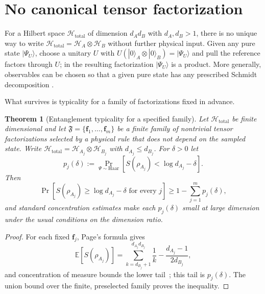 \documentclass[12pt,a4paper]{article}
\newtheorem{theorem}{Theorem}[section]
\begin{document}
\appendix

\section{No canonical tensor factorization}
\label{sec:nopref}

For a Hilbert space $\mathcal H_{\mathrm{total}}$ of dimension $d_Ad_B$ with $d_A,d_B>1$, there is no unique way to write $\mathcal H_{\mathrm{total}}=\mathcal H_A\otimes\mathcal H_B$ without further physical input. Given any pure state $|\Psi_U\rangle$, choose a unitary $U$ with $U(|0\rangle_A\otimes|0\rangle_B)=|\Psi_U\rangle$ and pull the reference factors through $U$; in the resulting factorization $|\Psi_U\rangle$ is a product. More generally, observables can be chosen so that a given pure state has any prescribed Schmidt decomposition \cite{HarshmanRanade2011}.

What survives is typicality for a family of factorizations fixed in advance.

\begin{theorem}[Entanglement typicality for a specified family]
\label{thm:nofact}
Let $\mathcal H_{\mathrm{total}}$ be finite dimensional and let
$\mathfrak F=\{\mathbf f_1,\ldots,\mathbf f_m\}$ be a finite family of
nontrivial tensor factorizations selected by a physical rule that does not depend on the sampled state.  Write
$\mathcal H_{\mathrm{total}}=\mathcal H_{A_j}\otimes\mathcal H_{B_j}$
with $d_{A_j}\le d_{B_j}$.  For $\delta>0$ let
\[
p_j(\delta):=
\Pr_{\Psi\sim\mathrm{Haar}}
\left[S(\rho_{A_j})<\log d_{A_j}-\delta\right].
\]
Then
\[
\Pr\left[
S(\rho_{A_j})\ge\log d_{A_j}-\delta
\text{ for every }j
\right]
\ge 1-\sum_{j=1}^m p_j(\delta),
\]
and standard concentration estimates make each $p_j(\delta)$ small at large dimension under the usual conditions on the dimension ratio.
\end{theorem}

\begin{proof}
For each fixed $\mathbf f_j$, Page's formula gives~\cite{Page1993}
\begin{equation}
\label{eq:page}
\mathbb{E}[S(\rho_{A_j})]
=\sum_{k=d_{B_j}+1}^{d_{A_j}d_{B_j}}\frac1k
-\frac{d_{A_j}-1}{2d_{B_j}},
\end{equation}
and concentration of measure bounds the lower tail~\cite{HaydenLeungWinter2006}; this tail is $p_j(\delta)$.  The union bound over the finite, preselected family proves the inequality.
\end{proof}
\end{document}
